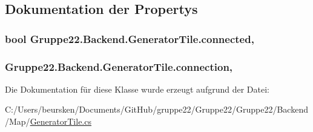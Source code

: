 \subsection{Dokumentation der Propertys}
\hypertarget{class_gruppe22_1_1_backend_1_1_generator_tile_aa2f02c266ad7b74d788e669c9478d445}{
\subsubsection[{connected}]{\setlength{\rightskip}{0pt plus 5cm}bool Gruppe22.\-Backend.\-Generator\-Tile.\-connected\hspace{0.3cm}{\ttfamily [get]}, {\ttfamily [set]}}}\label{class_gruppe22_1_1_backend_1_1_generator_tile_aa2f02c266ad7b74d788e669c9478d445}
\hypertarget{class_gruppe22_1_1_backend_1_1_generator_tile_aae87ad2fa7e0b2903c73b2cd939b3637}{
\subsubsection[{connection}]{ Gruppe22.\-Backend.\-Generator\-Tile.\-connection\hspace{0.3cm}{\ttfamily [get]}, {\ttfamily [set]}}}\label{class_gruppe22_1_1_backend_1_1_generator_tile_aae87ad2fa7e0b2903c73b2cd939b3637}


Die Dokumentation für diese Klasse wurde erzeugt aufgrund der Datei\-:\begin{DoxyCompactItemize}
\item 
C\-:/\-Users/beursken/\-Documents/\-Git\-Hub/gruppe22/\-Gruppe22/\-Gruppe22/\-Backend/\-Map/\hyperlink{_generator_tile_8cs}{Generator\-Tile.\-cs}\end{DoxyCompactItemize}
